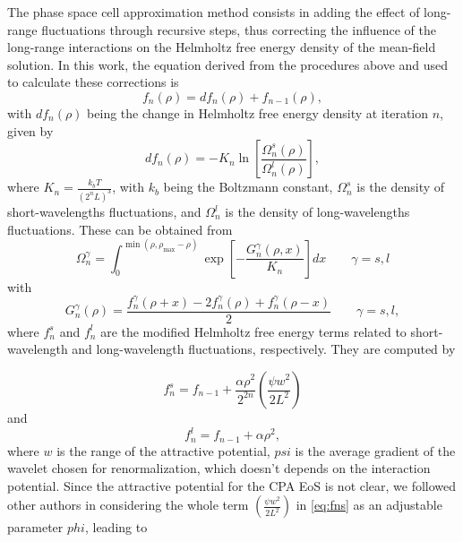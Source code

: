\documentclass[preprint,12pt,3p]{elsarticle}
\begin{document}
The phase space cell approximation method consists in adding the effect of long-range fluctuations through recursive steps, thus correcting the influence of the long-range interactions on the Helmholtz free energy density of the mean-field solution.
In this work, the equation derived from the procedures above and used to calculate these corrections is
\begin{equation} \label{eq:fn}
f_{n}(\rho) = df_{n}(\rho) + f_{n-1}(\rho),
\end{equation}
with $df_{n}(\rho)$ being the change in Helmholtz free energy density at iteration $n$, given by
\begin{equation} \label{eq:dfn}
df_{n}(\rho) = -K_{n} \ln\left[\frac{\Omega_{n}^{s}(\rho)}{\Omega_{n}^{l}(\rho)}\right],
\end{equation}
where $K_{n} = \frac{k_{b}T}{(2^{n}L)^3}$, with $k_{b}$ being the Boltzmann constant,
$\Omega_{n}^{s}$ is the density of short-wavelengths fluctuations, and
$\Omega_{n}^{l}$ is the density of long-wavelengths fluctuations.
These can be obtained from
\begin{equation} \label{eq:Omega}
\Omega_{n}^{\gamma} = \int_{0}^{\min(\rho,\rho_{\max}-\rho)}\exp\left[-\frac{G_{n}^{\gamma}(\rho,x)}{K_{n}}\right]dx \qquad  \gamma = s,l
\end{equation}
with
\begin{equation} \label{eq:Gn}
G_{n}^{\gamma}(\rho) = \frac{f_{n}^{\gamma}(\rho+x)-2f_{n}^{\gamma}(\rho)+f_{n}^{\gamma}(\rho-x)}{2} \qquad \gamma = s,l,
\end{equation}
where $f_{n}^{s}$ and $f_{n}^{l}$ are the modified Helmholtz free energy terms related to short-wavelength and long-wavelength fluctuations, respectively.
They are computed by

\begin{equation} \label{eq:fns_battle}
f_{n}^{s} = f_{n-1} + \frac{\alpha \rho^2}{2^{2n}}\left(\frac{\psi w^2}{2L^2}\right)
\end{equation}
and
\begin{equation} \label{eq:fnl}
f_{n}^{l} = f_{n-1} + \alpha\rho^2,
\end{equation}
where $w$ is the range of the attractive potential, $psi$ is the average gradient of the wavelet chosen for renormalization, which doesn't depends on the interaction potential.
Since the attractive potential for the CPA EoS is not clear, we followed other authors in considering the whole term $\left(\frac{\psi w^2}{2L^2}\right)$ in \cref{eq:fns} as an adjustable parameter $phi$, leading to
\end{document}
